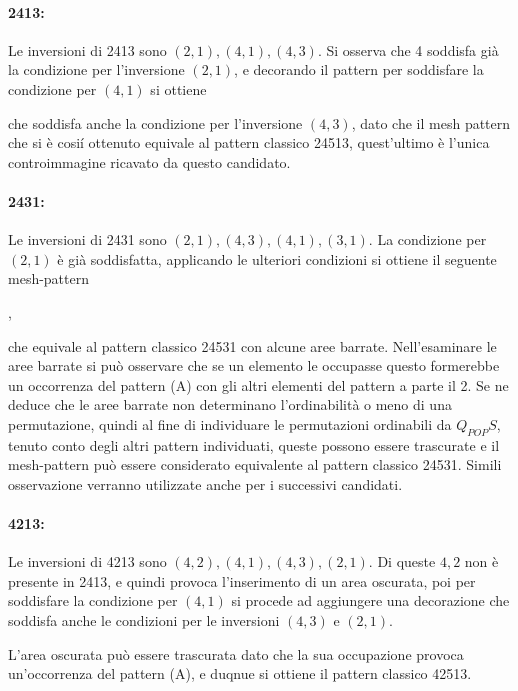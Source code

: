 \paragraph*{2413:} Le inversioni di 2413 sono $(2,1),(4,1),(4,3)$. Si osserva che 4 soddisfa gi\`a la condizione per l'inversione $(2,1)$, e decorando il pattern per soddisfare la condizione per $(4,1)$ si ottiene
\begin{center}\end{center} che soddisfa anche la condizione per l'inversione $(4,3)$, dato che il mesh pattern che si \`e cosi\'i ottenuto equivale al pattern classico 24513, quest'ultimo \`e l'unica controimmagine ricavato da questo candidato.
\paragraph*{2431:} Le inversioni di 2431 sono $(2,1),(4,3),(4,1),(3,1)$. La condizione per $(2,1)$ \`e gi\`a soddisfatta, applicando le ulteriori condizioni si ottiene il seguente mesh-pattern
\begin{center}
,
\end{center}
che equivale al pattern classico 24531 con alcune aree barrate. Nell'esaminare le aree barrate si pu\`o osservare che se un elemento le occupasse questo formerebbe un occorrenza del pattern (A) con gli altri elementi del pattern a parte il 2. Se ne deduce che le aree barrate non determinano l'ordinabilit\`a o meno di una permutazione, quindi al fine di individuare le permutazioni ordinabili da $Q_{POP}S$, tenuto conto degli altri pattern individuati, queste possono essere trascurate e il mesh-pattern pu\`o essere considerato equivalente al pattern classico 24531. Simili osservazione verranno utilizzate anche per i successivi candidati. 
\paragraph*{4213:}Le inversioni di 4213 sono $(4,2),(4,1),(4,3),(2,1)$. Di queste $4,2$ non \`e presente in 2413, e quindi provoca l'inserimento di un area oscurata, poi per soddisfare la condizione per $(4,1)$ si procede ad aggiungere una decorazione che soddisfa anche le condizioni per le inversioni $(4,3)$ e $(2,1)$.
\begin{center}
\end{center}
L'area oscurata pu\`o essere trascurata dato che la sua occupazione provoca un'occorrenza del pattern (A), e duqnue si ottiene il pattern classico 42513.
